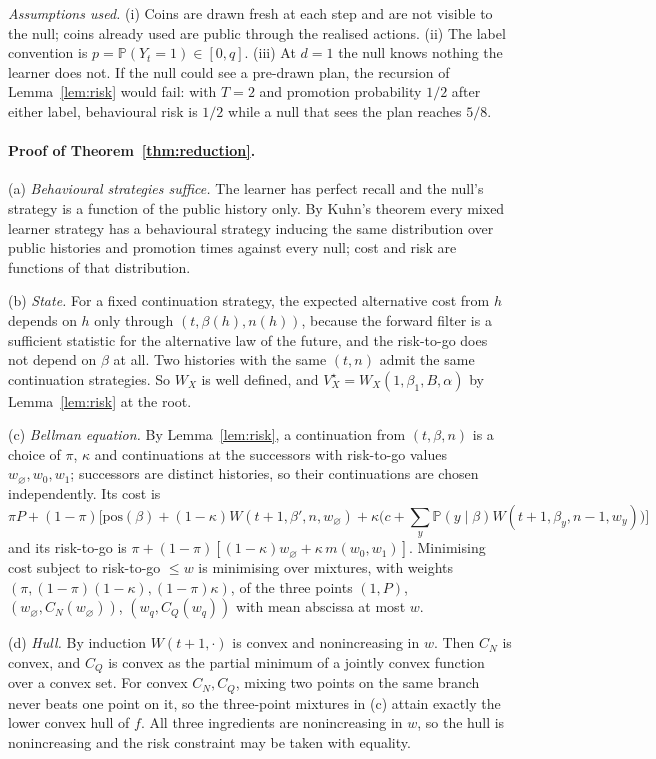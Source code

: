 \documentclass{article}
\theoremstyle{plain}
\theoremstyle{definition}
\theoremstyle{remark}
\newcommand{\PP}{\mathbb{P}}
\newcommand{\pos}{\mathrm{pos}}
\begin{document}
\emph{Assumptions used.} (i) Coins are drawn fresh at each step and are not visible to the null; coins already used are public through the realised actions. (ii) The label convention is $p=\PP(Y_t=1)\in[0,q]$. (iii) At $d=1$ the null knows nothing the learner does not. If the null could see a pre-drawn plan, the recursion of Lemma~\ref{lem:risk} would fail: with $T=2$ and promotion probability $1/2$ after either label, behavioural risk is $1/2$ while a null that sees the plan reaches $5/8$.

\paragraph{Proof of Theorem~\ref{thm:reduction}.}
(a) \emph{Behavioural strategies suffice.} The learner has perfect recall and the null's strategy is a function of the public history only. By Kuhn's theorem \citep{kuhn1953extensive} every mixed learner strategy has a behavioural strategy inducing the same distribution over public histories and promotion times against every null; cost and risk are functions of that distribution.

(b) \emph{State.} For a fixed continuation strategy, the expected alternative cost from $h$ depends on $h$ only through $(t,\beta(h),n(h))$, because the forward filter is a sufficient statistic for the alternative law of the future, and the risk-to-go does not depend on $\beta$ at all. Two histories with the same $(t,n)$ admit the same continuation strategies. So $W_X$ is well defined, and $V^\star_X=W_X(1,\beta_1,B,\alpha)$ by Lemma~\ref{lem:risk} at the root.

(c) \emph{Bellman equation.} By Lemma~\ref{lem:risk}, a continuation from $(t,\beta,n)$ is a choice of $\pi$, $\kappa$ and continuations at the successors with risk-to-go values $w_\varnothing,w_0,w_1$; successors are distinct histories, so their continuations are chosen independently. Its cost is
\[
\pi P+(1-\pi)\Big[\pos(\beta)+(1-\kappa)W(t+1,\beta',n,w_\varnothing)+\kappa\big(c+\textstyle\sum_y\PP(y\mid\beta)W(t+1,\beta_y,n-1,w_y)\big)\Big]
\]
and its risk-to-go is $\pi+(1-\pi)[(1-\kappa)w_\varnothing+\kappa\,m(w_0,w_1)]$. Minimising cost subject to risk-to-go $\le w$ is minimising over mixtures, with weights $(\pi,(1-\pi)(1-\kappa),(1-\pi)\kappa)$, of the three points $(1,P)$, $(w_\varnothing,C_N(w_\varnothing))$, $(w_q,C_Q(w_q))$ with mean abscissa at most $w$.

(d) \emph{Hull.} By induction $W(t+1,\cdot)$ is convex and nonincreasing in $w$. Then $C_N$ is convex, and $C_Q$ is convex as the partial minimum of a jointly convex function over a convex set. For convex $C_N,C_Q$, mixing two points on the same branch never beats one point on it, so the three-point mixtures in (c) attain exactly the lower convex hull of $f$. All three ingredients are nonincreasing in $w$, so the hull is nonincreasing and the risk constraint may be taken with equality.
\end{document}
